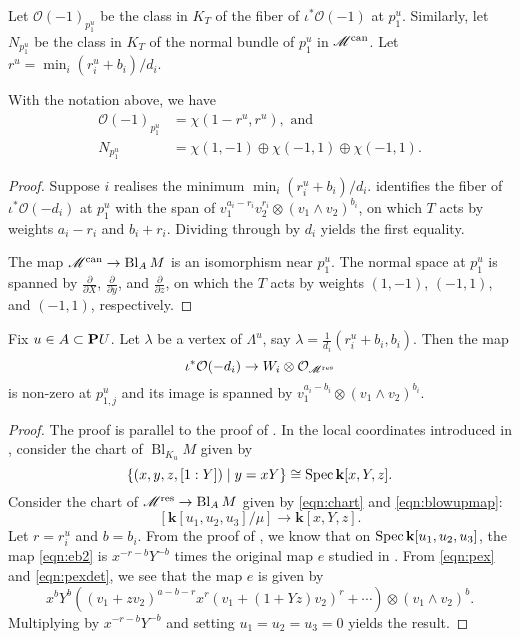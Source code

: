 \documentclass{amsart}
\renewcommand{\k}{\mathbf k}
\DeclareMathOperator{\Bl}{Bl}
\renewcommand{\O}{\mathcal O}
\begin{document}
Let \(\O(-1)_{p_1^u}\) be the class in \(K_T\) of the fiber of \(\iota^{*}\O(-1)\) at \(p_1^u\).
Similarly, let \(N_{p_1^u}\) be the class in \(K_T\) of the normal bundle of \(p_1^u\) in \(\mathscr M^{\rm can}\).
Let \(r^u = \min_i(r_i^u+b_i)/d_i\).
\begin{proposition}\label{prop:p1uall}
  With the notation above, we have
  \begin{align*}
    \O(-1)_{p_1^u} &= \chi(1- r^u, r^u), \text{ and }\\
    N_{p_1^u} &=  \chi(1,-1) \oplus \chi(-1,1) \oplus \chi(-1,1).             
  \end{align*}
\end{proposition}
\begin{proof}
  Suppose \(i\) realises the minimum \(\min_i(r_i^u+b_i)/d_i\).
   identifies the fiber of \(\iota^{*}\O(-d_i)\) at \(p_1^u\) with the span of \(v_1^{a_i-r_i}v_2^{r_i} \otimes (v_1\wedge v_2)^{b_i}\), on which \(T\) acts by weights \(a_i-r_i\) and \(b_i+r_i\).
  Dividing through by \(d_i\) yields the first equality.

  The map \(\mathscr M^{\rm can} \to \Bl_AM\) is an isomorphism near \(p_1^u\).
  The normal space at \(p_1^u\) is spanned by \(\frac{\partial}{\partial X}\), \(\frac{\partial}{\partial y}\), and  \(\frac{\partial}{\partial z}\), on which the \(T\) acts by weights \((1,-1)\), \((-1,1)\), and \((-1,1)\), respectively.

\end{proof}

\begin{proposition}\label{prop:p1juO1}
  Fix \(u \in A \subset \P U\).
  Let \(\lambda\) be a vertex of \(\Lambda^u\), say \(\lambda = \frac{1}{d_i}(r_i^u+b_i,b_i)\).
  Then the map
  \begin{equation}\label{eqn:eb2}
    \iota^{*} \O(-d_i) \to W_i \otimes \O_{\mathscr M^{\rm res}}
  \end{equation}
  is non-zero at \(p_{1,j}^u\) and its image is spanned by \(v_1^{a_i-b_i} \otimes (v_1\wedge v_2)^{b_i}\).
\end{proposition}
\begin{proof}
  The proof is parallel to the proof of .
  In the local coordinates introduced in , consider the chart of \(\Bl_{K_u}M\) given by
  \[\{(x,y,z,[1:Y]) \mid y = xY\} \cong \spec \k[x,Y,z].\]
  Consider the chart of \(\mathscr M^{\rm res} \to \Bl_AM\) given by \eqref{eqn:chart} and \eqref{eqn:blowupmap}:
  \[[\k[u_1,u_2,u_3] / \mu] \to \k[x,Y,z].\]
  Let \(r = r_i^u\) and \(b = b_i\).
  From the proof of , we know that on \(\spec \k[u_1,u_2,u_3]\), the map \eqref{eqn:eb2} is \(x^{-r-b}Y^{-b}\) times the original map \(e\) studied in .
  From \eqref{eqn:pex} and \eqref{eqn:pexdet}, we see that the map \(e\) is given by
  \[
   x^bY^b((v_1+zv_2)^{a-b-r}x^r(v_1+(1+Yz)v_2)^{r} + \cdots) \otimes (v_1 \wedge v_2)^b.
  \]
Multiplying by \(x^{-r-b}Y^{-b}\) and setting \(u_1 = u_2 = u_3 = 0\) yields the result.
\end{proof}
\end{document}
